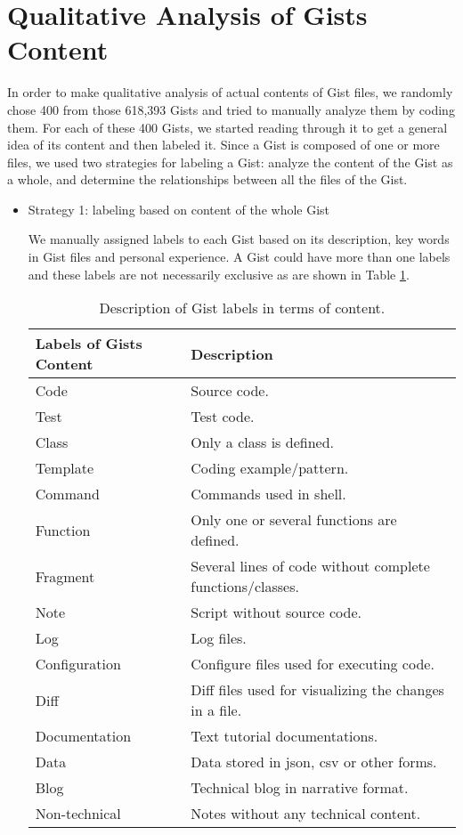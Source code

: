 \section{Qualitative Analysis of Gists Content}

In order to make qualitative analysis of actual contents of Gist files, we randomly chose 400 from those 618,393 Gists and tried to manually analyze them by coding them. For each of these 400 Gists, we started reading through it to get a general idea of its content and then labeled it. Since a Gist is composed of one or more files, we used two strategies for labeling a Gist: analyze the content of the Gist as a whole, and determine the relationships between all the files of the Gist.  

\begin{itemize}

  \item Strategy 1: labeling based on content of the whole Gist

  We manually assigned labels to each Gist based on its description, key words in Gist files and personal experience. A Gist could have more than one labels and these labels are not necessarily exclusive as are shown in Table \ref{tb:gistcontentlabels}.

\begin{table}[!htb]
 \begin{center}
 \begin{tabular}{ll} 
   \textbf{Labels of Gists Content}	&	\textbf{Description}\\ \hline
   Code & Source code.\\
   Test & Test code.\\ 
   Class & Only a class is defined.\\ 
   Template & Coding example/pattern.\\ 
   Command & Commands used in shell.\\ 
   Function & Only one or several functions are defined.\\ 
   Fragment & Several lines of code without complete functions/classes.\\
   Note & Script without source code.\\ 
   Log & Log files.\\ 
   Configuration & Configure files used for executing code.\\ 
   Diff & Diff files used for visualizing the changes in a file.\\ 
   Documentation & Text tutorial documentations.\\ 
   Data & Data stored in json, csv or other forms.\\ 
   Blog & Technical blog in narrative format.\\ 
   Non-technical & Notes without any technical content.\\ \hline
 \end{tabular}
 \end{center}
 \caption{Description of Gist labels in terms of content.}
 \label{tb:gistcontentlabels}
\end{table}


\end{itemize}
